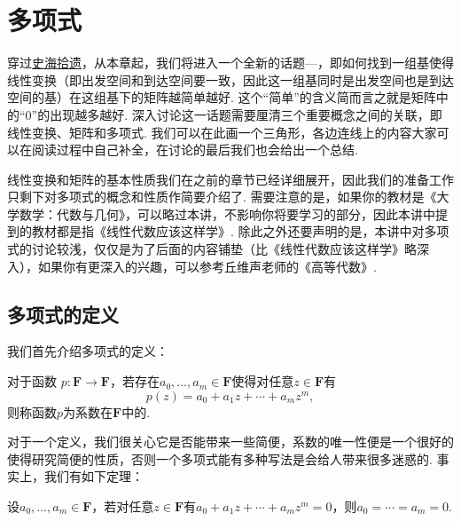 \chapter{多项式}

穿过\hyperref[chap:史海拾遗]{史海拾遗}，从本章起，我们将进入一个全新的话题—，即如何找到一组基使得线性变换（即出发空间和到达空间要一致，因此这一组基同时是出发空间也是到达空间的基）在这组基下的矩阵越简单越好. 这个``简单''的含义简而言之就是矩阵中的``0''的出现越多越好. 深入讨论这一话题需要厘清三个重要概念之间的关联，即线性变换、矩阵和多项式. 我们可以在此画一个三角形，各边连线上的内容大家可以在阅读过程中自己补全，在讨论的最后我们也会给出一个总结.

\begin{figure}[H]
    \centering
\end{figure}

线性变换和矩阵的基本性质我们在之前的章节已经详细展开，因此我们的准备工作只剩下对多项式的概念和性质作简要介绍了. 需要注意的是，如果你的教材是《大学数学：代数与几何》，可以略过本讲，不影响你将要学习的部分，因此本讲中提到的教材都是指《线性代数应该这样学》. 除此之外还要声明的是，本讲中对多项式的讨论较浅，仅仅是为了后面的内容铺垫（比《线性代数应该这样学》略深入），如果你有更深入的兴趣，可以参考丘维声老师的《高等代数》.

\section{多项式的定义}

我们首先介绍多项式的定义：
\begin{definition}[多项式] 
    对于函数 $p:\mathbf{F}\to\mathbf{F}$，若存在$a_0,\ldots,a_m\in\mathbf{F}$使得对任意$z\in\mathbf{F}$有
    \begin{equation}\label{eq:17:多项式定义}
        p(z)=a_0+a_1z+\cdots+a_mz^m,
    \end{equation}
    则称函数$p$为系数在$\mathbf{F}$中的.
\end{definition}

对于一个定义，我们很关心它是否能带来一些简便，系数的唯一性便是一个很好的使得研究简便的性质，否则一个多项式能有多种写法是会给人带来很多迷惑的. 事实上，我们有如下定理：
\begin{theorem}
    设$a_0,\ldots,a_m\in\mathbf{F}$，若对任意$z\in\mathbf{F}$有$a_0+a_1z+\cdots+a_mz^m=0$，则$a_0=\cdots=a_m=0$.
\end{theorem}

